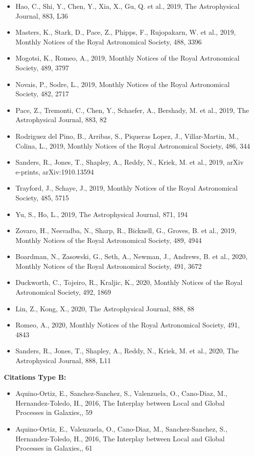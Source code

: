 \documentclass{letter}
\begin{document}
\begin{enumerate}
\begin{itemize}
\item Hao, C., Shi, Y., Chen, Y., Xia, X., Gu, Q. et al., 2019, The Astrophysical Journal, 883, L36
\item Masters, K., Stark, D., Pace, Z., Phipps, F., Rujopakarn, W. et al., 2019, Monthly Notices of the Royal Astronomical Society, 488, 3396
\item Mogotsi, K., Romeo, A., 2019, Monthly Notices of the Royal Astronomical Society, 489, 3797
\item Novais, P., Sodre, L., 2019, Monthly Notices of the Royal Astronomical Society, 482, 2717
\item Pace, Z., Tremonti, C., Chen, Y., Schaefer, A., Bershady, M. et al., 2019, The Astrophysical Journal, 883, 82
\item Rodriguez del Pino, B., Arribas, S., Piqueras Lopez, J., Villar-Martin, M., Colina, L., 2019, Monthly Notices of the Royal Astronomical Society, 486, 344
\item Sanders, R., Jones, T., Shapley, A., Reddy, N., Kriek, M. et al., 2019, arXiv e-prints, arXiv:1910.13594
\item Trayford, J., Schaye, J., 2019, Monthly Notices of the Royal Astronomical Society, 485, 5715
\item Yu, S., Ho, L., 2019, The Astrophysical Journal, 871, 194
\item Zovaro, H., Nesvadba, N., Sharp, R., Bicknell, G., Groves, B. et al., 2019, Monthly Notices of the Royal Astronomical Society, 489, 4944
\item Boardman, N., Zasowski, G., Seth, A., Newman, J., Andrews, B. et al., 2020, Monthly Notices of the Royal Astronomical Society, 491, 3672
\item Duckworth, C., Tojeiro, R., Kraljic, K., 2020, Monthly Notices of the Royal Astronomical Society, 492, 1869
\item Lin, Z., Kong, X., 2020, The Astrophysical Journal, 888, 88
\item Romeo, A., 2020, Monthly Notices of the Royal Astronomical Society, 491, 4843
\item Sanders, R., Jones, T., Shapley, A., Reddy, N., Kriek, M. et al., 2020, The Astrophysical Journal, 888, L11
\end{itemize}
{\bf Citations Type B:}
\begin{itemize}
\item Aquino-Ortiz, E., Sanchez-Sanchez, S., Valenzuela, O., Cano-Diaz, M., Hernandez-Toledo, H., 2016, The Interplay between Local and Global Processes in Galaxies,, 59
\item Aquino-Ortiz, E., Valenzuela, O., Cano-Diaz, M., Sanchez-Sanchez, S., Hernandez-Toledo, H., 2016, The Interplay between Local and Global Processes in Galaxies,, 61

\end{itemize}
\end{enumerate}
\end{document}
